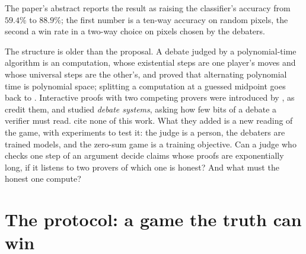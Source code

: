 \begin{refsection}

The paper's abstract reports the result as raising the classifier's accuracy from $59.4\%$ to $88.9\%$; the first number is a ten-way accuracy on random pixels, the second a win rate in a two-way choice on pixels chosen by the debaters.

The structure is older than the proposal. A debate judged by a polynomial-time algorithm is an  computation, whose existential steps are one player's moves and whose universal steps are the other's, and \textcite{ChandraKozenStockmeyer1981} proved that alternating polynomial time is polynomial space; splitting a computation at a guessed midpoint goes back to \textcite{Savitch1970}. Interactive proofs with two competing provers were introduced by \textcite{FeigeShamirTennenholtz1988}, as \textcite{KolRaz2014} credit them, and \textcite{CondonEtAl1995} studied \emph{debate systems}, asking how few bits of a debate a verifier must read. \Textcite{IrvingEtAl2018} cite none of this work. What they added is a new reading of the game, with experiments to test it: the judge is a person, the debaters are trained models, and the zero-sum game is a training objective. Can a judge who checks one step of an argument decide claims whose proofs are exponentially long, if it listens to two provers of which one is honest? And what must the honest one compute?

\section{The protocol: a game the truth can win}\label{sec:debate:protocol}


\end{refsection}
